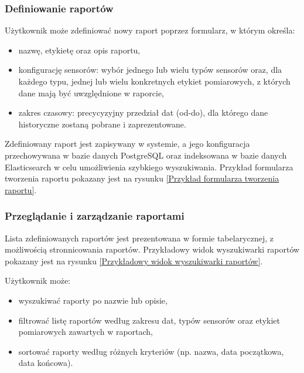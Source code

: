 \subsubsection{Definiowanie raportów}
Użytkownik może zdefiniować nowy raport poprzez formularz, w którym określa:
\begin{itemize}
    \item nazwę, etykietę oraz opis raportu,
    \item konfigurację sensorów: wybór jednego lub wielu typów sensorów oraz, dla każdego typu, jednej lub wielu konkretnych etykiet pomiarowych, z których dane mają być uwzględnione w raporcie,
    \item zakres czasowy: precycyzyjny przedział dat (od-do), dla którego dane historyczne zostaną pobrane i zaprezentowane.
\end{itemize}
Zdefiniowany raport jest zapisywany w systemie, a jego konfiguracja przechowywana w bazie danych PostgreSQL oraz indeksowana w bazie danych Elasticsearch w celu umożliwienia szybkiego wyszukiwania. Przykład formularza tworzenia raportu pokazany jest na rysunku \ref{Przykład formularza tworzenia raportu}.


\newpage

\subsubsection{Przeglądanie i zarządzanie raportami}

Lista zdefiniowanych raportów jest prezentowana w formie tabelarycznej, z możliwością stronnicowania raportów. Przykładowy widok wyszukiwarki raportów pokazany jest na rysunku \ref{Przykładowy widok wyszukiwarki raportów}.

\vspace{0.3em}

Użytkownik może:

\begin{itemize}
    \item wyszukiwać raporty po nazwie lub opisie,
    \item filtrować listę raportów według zakresu dat, typów sensorów oraz etykiet pomiarowych zawartych w raportach,
    \item sortować raporty według różnych kryteriów (np. nazwa, data początkowa, data końcowa).
\end{itemize}

